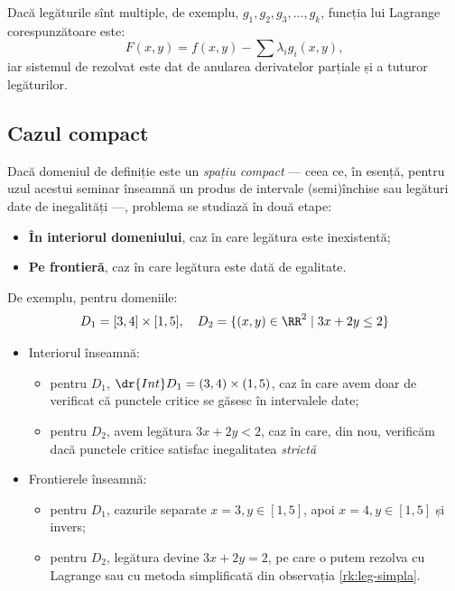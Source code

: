 \begin{remark}\label{rk:mm-leg}
  Dacă legăturile sînt multiple, de exemplu, $ g_1, g_2, g_3, \dots, g_k $,
  funcția lui Lagrange corespunzătoare este:
  \[
    F(x, y) = f(x, y) - \sum \lambda_i g_i(x, y),
  \]
  iar sistemul de rezolvat este dat de anularea derivatelor parțiale și
  a tuturor legăturilor.
\end{remark}


\subsection{Cazul compact}

Dacă domeniul de definiție este un \emph{spațiu compact} --- ceea ce, în esență,
pentru uzul acestui seminar înseamnă un produs de intervale (semi)închise
sau legături date de inegalități ---, problema se studiază în două etape:
\begin{itemize}
\item \textbf{În interiorul domeniului}, caz în care legătura este inexistentă;
\item \textbf{Pe frontieră}, caz în care legătura este dată de egalitate.
\end{itemize}

De exemplu, pentru domeniile:
\[
  D_1 = [3, 4] \times [1, 5], \quad D_2 = \{ (x, y) \in \RR^2 \mid 3x + 2y \leq 2 \}
\]
\begin{itemize}
\item Interiorul înseamnă:
  \begin{itemize}
  \item pentru $ D_1 $, $ \dr{Int}D_1 = (3, 4) \times (1, 5) $, caz în care avem
    doar de verificat că punctele critice se găsesc în intervalele date;
  \item pentru $ D_2 $, avem legătura $ 3x + 2y < 2 $, caz în care, din nou,
    verificăm dacă punctele critice satisfac inegalitatea \emph{strictă}
  \end{itemize}
\item Frontierele înseamnă:
  \begin{itemize}
  \item pentru $ D_1 $, cazurile separate $ x = 3, y \in [1, 5] $, apoi
    $ x = 4, y \in [1, 5] $ și invers;
  \item pentru $ D_2 $, legătura devine $ 3x + 2y = 2 $, pe care o putem rezolva
    cu Lagrange sau cu metoda simplificată din observația \ref{rk:leg-simpla}.
  \end{itemize}
\end{itemize}

